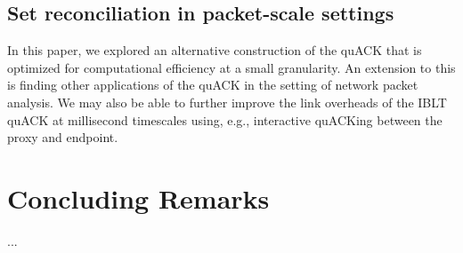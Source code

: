 \subsection{Set reconciliation in packet-scale settings}
\label{sec:conclusion:future:set-reconciliation}

In this paper, we explored an alternative construction of the quACK that is
optimized for computational efficiency at a small granularity. An extension to
this is finding other applications of the quACK in the setting of network
packet analysis. We may also be able to further improve the link overheads of
the IBLT quACK at millisecond timescales using, e.g., interactive quACKing
between the proxy and endpoint.



\section{Concluding Remarks}
\label{sec:conclusion:remarks}
...
